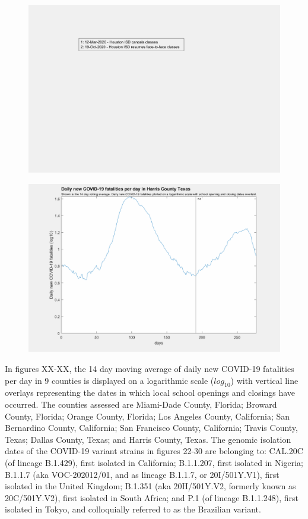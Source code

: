 \documentclass[]{article}
\begin{document}
\begin{figure}[!h]
	\includegraphics[width=\linewidth]{legends/harris_school_legend.png}
	\caption{}
	\label{fig:legends/harris_school_legendLabel}
\end{figure}

\begin{figure}[!h]
	\includegraphics[width=\linewidth]{images/harris_fatalities_school_log.png}
	\caption{}
	\label{fig:images/harris_fatalities_school_logLabel}
\end{figure}

\FloatBarrier

In figures XX-XX, the 14 day moving average of daily new COVID-19 fatalities per day in 9 counties is displayed on a logarithmic scale ($log_{10}$) with vertical line overlays representing the dates in which local school openings and closings have occurred. The counties assessed are Miami-Dade County, Florida; Broward County, Florida; Orange County, Florida; Los Angeles County, California; San Bernardino County, California; San Francisco County, California; Travis County, Texas; Dallas County, Texas; and Harris County, Texas. The genomic isolation dates of the COVID-19 variant strains in figures 22-30 are belonging to: CAL.20C (of lineage B.1.429), first isolated in California; B.1.1.207, first isolated in Nigeria; B.1.1.7 (aka VOC-202012/01, and as lineage B.1.1.7, or 20I/501Y.V1), first isolated in the United Kingdom; B.1.351 (aka 20H/501Y.V2, formerly known as 20C/501Y.V2), first isolated in South Africa; and P.1 (of lineage B.1.1.248), first isolated in Tokyo, and colloquially referred to as the Brazilian variant.
\end{document}
